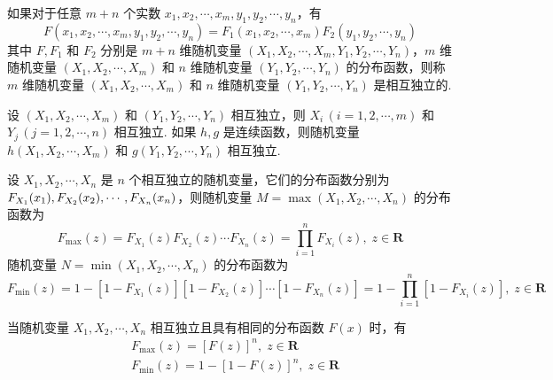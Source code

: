 如果对于任意 $m+n$ 个实数 $x_1,x_2,\cdots,x_m,y_1,y_2,\cdots,y_n$，有
$$
F(x_1,x_2,\cdots,x_m,y_1,y_2,\cdots,y_n) = F_1(x_1,x_2,\cdots,x_m) F_2(y_1,y_2,\cdots,y_n)
$$
其中 $F,F_1$ 和 $F_2$ 分别是 $m+n$ 维随机变量 $(X_1,X_2,\cdots,X_m,Y_1,Y_2,\cdots,Y_n)$，$m$ 维随机变量 $(X_1,X_2,\cdots,X_m)$ 和 $n$ 维随机变量 $(Y_1,Y_2,\cdots,Y_n)$ 的分布函数，则称 $m$ 维随机变量 $(X_1,X_2,\cdots,X_m)$ 和 $n$ 维随机变量 $(Y_1,Y_2,\cdots,Y_n)$ 是相互独立的.

设 $(X_1,X_2,\cdots,X_m)$ 和 $(Y_1,Y_2,\cdots,Y_n)$ 相互独立，则 $X_i \, (i=1,2,\cdots,m)$ 和 $Y_j \, (j=1,2,\cdots,n)$ 相互独立. 如果 $h,g$ 是连续函数，则随机变量 $h(X_1,X_2,\cdots,X_m)$ 和 $g(Y_1,Y_2,\cdots,Y_n)$ 相互独立.

设 $X_1,X_2,\cdots,X_n$ 是 $n$ 个相互独立的随机变量，它们的分布函数分别为 $F_{X_1}(x_1), F_{X_2}(x_2), \cdots,\\ F_{X_n}(x_n)$，则随机变量 $M = \max(X_1,X_2,\cdots,X_n)$ 的分布函数为
$$
F_{\text{max}}(z) = F_{X_1}(z) F_{X_2}(z) \cdots F_{X_n}(z) = \prod_{i=1}^n F_{X_i}(z), \; z \in \mathbf{R}
$$
随机变量 $N = \min(X_1,X_2,\cdots,X_n)$ 的分布函数为
$$
F_{\text{min}}(z) = 1-[1-F_{X_1}(z)][1-F_{X_2}(z)] \cdots [1-F_{X_n}(z)] = 1-\prod_{i=1}^n [1-F_{X_i}(z)], \; z \in \mathbf{R}
$$

当随机变量 $X_1,X_2,\cdots,X_n$ 相互独立且具有相同的分布函数 $F(x)$ 时，有
$$
\begin{aligned}
    & F_{\text{max}}(z) = [F(z)]^n, \; z \in \mathbf{R} \\
    & F_{\text{min}}(z) = 1-[1-F(z)]^n, \; z \in \mathbf{R}
\end{aligned}
$$